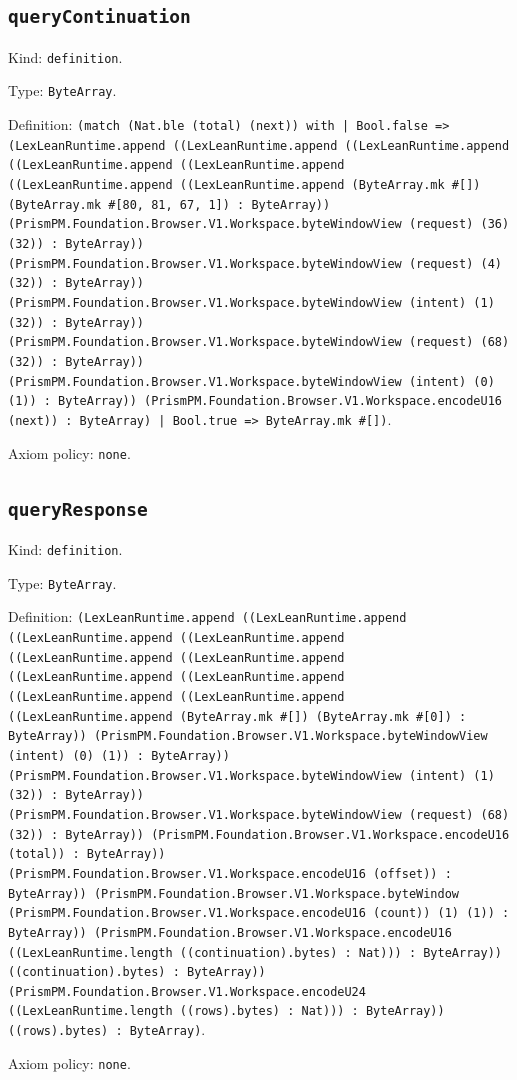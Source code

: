 \documentclass[11pt]{article}
\begin{document}
\subsection*{\texttt{queryContinuation}}
\noindent Kind: \texttt{definition}.\par
\noindent Type: \texttt{ByteArray}.\par
\noindent Definition: \texttt{(match (Nat.ble (total) (next)) with | Bool.false => (LexLeanRuntime.append ((LexLeanRuntime.append ((LexLeanRuntime.append ((LexLeanRuntime.append ((LexLeanRuntime.append ((LexLeanRuntime.append ((LexLeanRuntime.append (ByteArray.mk \#[]) (ByteArray.mk \#[80, 81, 67, 1]) : ByteArray)) (PrismPM.Foundation.Browser.V1.Workspace.byteWindowView (request) (36) (32)) : ByteArray)) (PrismPM.Foundation.Browser.V1.Workspace.byteWindowView (request) (4) (32)) : ByteArray)) (PrismPM.Foundation.Browser.V1.Workspace.byteWindowView (intent) (1) (32)) : ByteArray)) (PrismPM.Foundation.Browser.V1.Workspace.byteWindowView (request) (68) (32)) : ByteArray)) (PrismPM.Foundation.Browser.V1.Workspace.byteWindowView (intent) (0) (1)) : ByteArray)) (PrismPM.Foundation.Browser.V1.Workspace.encodeU16 (next)) : ByteArray) | Bool.true => ByteArray.mk \#[])}.\par
\noindent Axiom policy: \texttt{none}.\par
\subsection*{\texttt{queryResponse}}
\noindent Kind: \texttt{definition}.\par
\noindent Type: \texttt{ByteArray}.\par
\noindent Definition: \texttt{(LexLeanRuntime.append ((LexLeanRuntime.append ((LexLeanRuntime.append ((LexLeanRuntime.append ((LexLeanRuntime.append ((LexLeanRuntime.append ((LexLeanRuntime.append ((LexLeanRuntime.append ((LexLeanRuntime.append ((LexLeanRuntime.append ((LexLeanRuntime.append (ByteArray.mk \#[]) (ByteArray.mk \#[0]) : ByteArray)) (PrismPM.Foundation.Browser.V1.Workspace.byteWindowView (intent) (0) (1)) : ByteArray)) (PrismPM.Foundation.Browser.V1.Workspace.byteWindowView (intent) (1) (32)) : ByteArray)) (PrismPM.Foundation.Browser.V1.Workspace.byteWindowView (request) (68) (32)) : ByteArray)) (PrismPM.Foundation.Browser.V1.Workspace.encodeU16 (total)) : ByteArray)) (PrismPM.Foundation.Browser.V1.Workspace.encodeU16 (offset)) : ByteArray)) (PrismPM.Foundation.Browser.V1.Workspace.byteWindow (PrismPM.Foundation.Browser.V1.Workspace.encodeU16 (count)) (1) (1)) : ByteArray)) (PrismPM.Foundation.Browser.V1.Workspace.encodeU16 ((LexLeanRuntime.length ((continuation).bytes) : Nat))) : ByteArray)) ((continuation).bytes) : ByteArray)) (PrismPM.Foundation.Browser.V1.Workspace.encodeU24 ((LexLeanRuntime.length ((rows).bytes) : Nat))) : ByteArray)) ((rows).bytes) : ByteArray)}.\par
\noindent Axiom policy: \texttt{none}.\par
\end{document}
